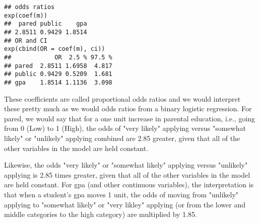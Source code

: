 \documentclass[00-GLMregslides.tex]{subfiles}
\begin{document}
\begin{frame}[fragile]
	\begin{verbatim}
## odds ratios
exp(coef(m))
##  pared public    gpa 
## 2.8511 0.9429 1.8514
## OR and CI
exp(cbind(OR = coef(m), ci))
##            OR  2.5 % 97.5 %
## pared  2.8511 1.6958  4.817
## public 0.9429 0.5209  1.681
## gpa    1.8514 1.1136  3.098
\end{verbatim}
\end{frame}
\begin{frame}
These coefficients are called proportional odds ratios and we would interpret these pretty much as we would odds ratios from a binary logistic regression. For pared, we would say that for a one unit increase in parental education, i.e., going from 0 (Low) to 1 (High), the odds of "very likely" applying versus "somewhat likely" or "unlikely" applying combined are 2.85 greater, given that all of the other variables in the model are held constant. 
\end{frame}
\begin{frame}
Likewise, the odds "very likely" or "somewhat likely" applying versus "unlikely" applying is 2.85 times greater, given that all of the other variables in the model are held constant. For gpa (and other continuous variables), the interpretation is that when a student's gpa moves 1 unit, the odds of moving from "unlikely" applying to "somewhat likely" or "very likley" applying (or from the lower and middle categories to the high category) are multiplied by 1.85.
\end{frame}
\end{document}
